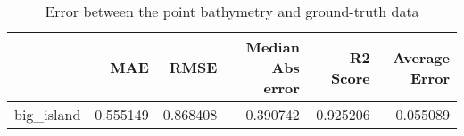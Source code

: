\begin{table}[h!]
\caption{Error between the point bathymetry and ground-truth data}
\label{tab:big_island_lidar_error}
\begin{tabular}{lrrrrr}
\toprule
 & MAE & RMSE & Median Abs error & R2 Score & Average Error \\
\midrule
big_island & 0.555149 & 0.868408 & 0.390742 & 0.925206 & 0.055089 \\
\bottomrule
\end{tabular}
\end{table}
